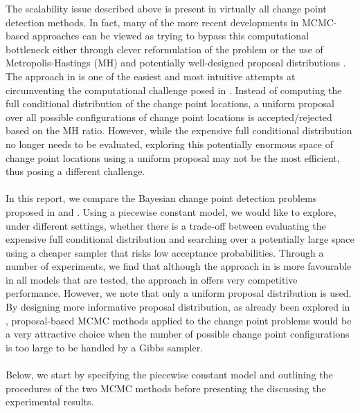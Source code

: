 The scalability issue described above is present in virtually all change point detection methods. In fact, many of the more recent developments in MCMC-based approaches can be viewed as trying to bypass this computational bottleneck either through clever reformulation of the problem \cite{stephens1994bayesian,lavielle2001application} or the use of Metropolis-Hastings (MH) and potentially well-designed proposal distributions \cite{green1995reversible,antoch2008application}. The approach in \cite{antoch2008application} is one of the easiest and most intuitive attempts at circumventing the computational challenge posed in \cite{carlin1992hierarchical}. Instead of computing the full conditional distribution of the change point locations, a uniform proposal over all possible configurations of change point locations is accepted/rejected based on the MH ratio. However, while the expensive full conditional distribution no longer needs to be evaluated, exploring this potentially enormous space of change point locations using a uniform proposal may not be the most efficient, thus posing a different challenge.\\\\
In this report, we compare the Bayesian change point detection problems proposed in \cite{carlin1992hierarchical} and \cite{antoch2008application}. Using a piecewise constant model, we would like to explore, under different settings, whether there is a trade-off between evaluating the expensive full conditional distribution and searching over a potentially large space using a cheaper sampler that risks low acceptance probabilities. Through a number of experiments, we find that although the approach in \cite{carlin1992hierarchical} is more favourable in all models that are tested, the approach in \cite{antoch2008application} offers very competitive performance. However, we note that only a uniform proposal distribution is used. By designing more informative proposal distribution, as already been explored in \cite{benson2018adaptive}, proposal-based MCMC methods applied to the change point problems would be a very attractive choice when the number of possible change point configurations is too large to be handled by a Gibbs sampler.\\\\
Below, we start by specifying the piecewise constant model and outlining the procedures of the two MCMC methods before presenting the discussing the experimental results.

